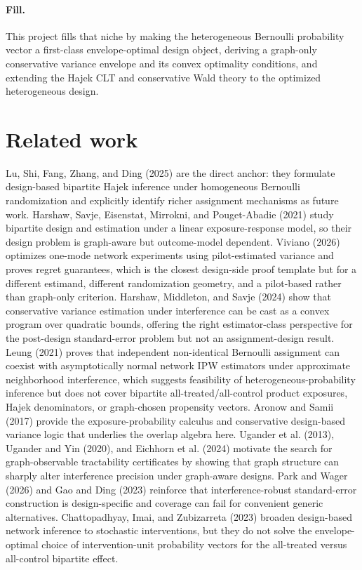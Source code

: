 \documentclass{article}
\begin{document}
\paragraph{Fill.} This project fills that niche by making the heterogeneous Bernoulli probability vector a first-class envelope-optimal design object, deriving a graph-only conservative variance envelope and its convex optimality conditions, and extending the Hajek CLT and conservative Wald theory to the optimized heterogeneous design.

\section{Related work}

Lu, Shi, Fang, Zhang, and Ding (2025) are the direct anchor: they formulate design-based bipartite Hajek inference under homogeneous Bernoulli randomization and explicitly identify richer assignment mechanisms as future work. Harshaw, Savje, Eisenstat, Mirrokni, and Pouget-Abadie (2021) study bipartite design and estimation under a linear exposure-response model, so their design problem is graph-aware but outcome-model dependent. Viviano (2026) optimizes one-mode network experiments using pilot-estimated variance and proves regret guarantees, which is the closest design-side proof template but for a different estimand, different randomization geometry, and a pilot-based rather than graph-only criterion. Harshaw, Middleton, and Savje (2024) show that conservative variance estimation under interference can be cast as a convex program over quadratic bounds, offering the right estimator-class perspective for the post-design standard-error problem but not an assignment-design result. Leung (2021) proves that independent non-identical Bernoulli assignment can coexist with asymptotically normal network IPW estimators under approximate neighborhood interference, which suggests feasibility of heterogeneous-probability inference but does not cover bipartite all-treated/all-control product exposures, Hajek denominators, or graph-chosen propensity vectors. Aronow and Samii (2017) provide the exposure-probability calculus and conservative design-based variance logic that underlies the overlap algebra here. Ugander et al. (2013), Ugander and Yin (2020), and Eichhorn et al. (2024) motivate the search for graph-observable tractability certificates by showing that graph structure can sharply alter interference precision under graph-aware designs. Park and Wager (2026) and Gao and Ding (2023) reinforce that interference-robust standard-error construction is design-specific and coverage can fail for convenient generic alternatives. Chattopadhyay, Imai, and Zubizarreta (2023) broaden design-based network inference to stochastic interventions, but they do not solve the envelope-optimal choice of intervention-unit probability vectors for the all-treated versus all-control bipartite effect.
\end{document}
